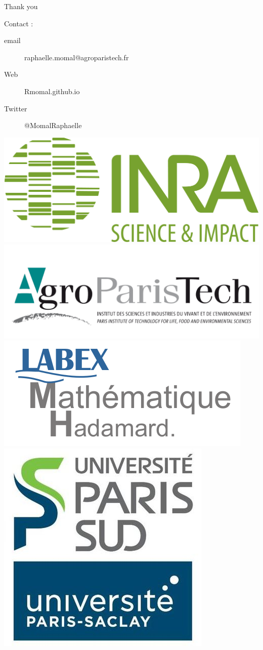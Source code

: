 \documentclass[11pt]{beamer}
\begin{document}
\begin{frame}{}

\begin{center}
\huge{Thank you}    
\end{center}

\bigskip
\bigskip

\small{
Contact :\\
\begin{description}
\item[email] raphaelle.momal@agroparistech.fr
\item[Web]Rmomal.github.io
\item[Twitter] @MomalRaphaelle\\
\end{description}}
\begin{center}
	\includegraphics[width=0.25\linewidth]{logo_inra.jpg}\hspace{0.1cm}
	\includegraphics[width=0.25\linewidth]{agro.PNG}
	\includegraphics[width=0.25\linewidth]{lmh.png}\hspace{0.1cm}
	\includegraphics[width=0.15\linewidth]{upsud.jpg}
    
\end{center}

\end{frame}

\end{document}
